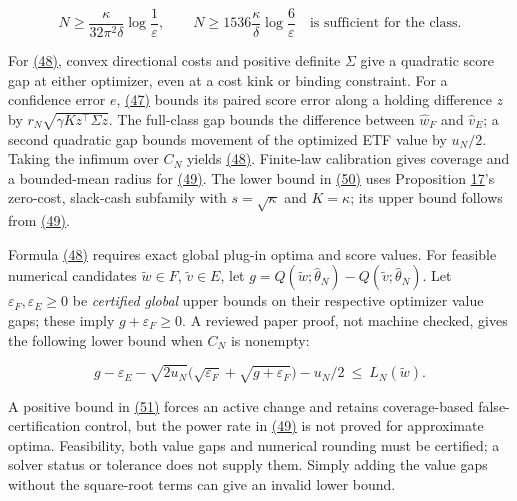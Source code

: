 \documentclass[11pt]{article}
\begin{document}
\begin{equation*}
N\geq\frac{\kappa}{32\pi^2\delta}
       \log\frac1\varepsilon,
\qquad
N\geq1536\frac{\kappa}{\delta}
       \log\frac6\varepsilon
\quad\text{is sufficient for the class}.\tag{50}\label{eq:50}
\end{equation*}

For \hyperref[eq:48]{(48)}, convex directional costs and positive definite
\(\Sigma\) give a quadratic score gap at either optimizer,
even at a cost kink or binding constraint. For a confidence
error \(e\), \hyperref[eq:47]{(47)} bounds its paired score error along a
holding difference \(z\) by
\(r_N\sqrt{\gamma K z^\top\Sigma z}\). The full-class
gap bounds the difference between \(\widehat w_F\) and
\(\widehat v_E\); a second quadratic gap bounds movement of
the optimized ETF value by \(u_N/2\). Taking the infimum
over \(C_N\) yields \hyperref[eq:48]{(48)}. Finite-law calibration gives
coverage and a bounded-mean radius for \hyperref[eq:49]{(49)}. The lower
bound in \hyperref[eq:50]{(50)} uses Proposition \hyperref[res:Proposition-17]{17}'s zero-cost, slack-cash
subfamily with \(s=\sqrt\kappa\) and \(K=\kappa\); its
upper bound follows from \hyperref[eq:49]{(49)}.

Formula \hyperref[eq:48]{(48)} requires exact global plug-in optima and score
values. For feasible numerical candidates
\(\widetilde w\in F\), \(\widetilde v\in E\), let
\(g=Q(\widetilde w;\widehat\theta_N)
-Q(\widetilde v;\widehat\theta_N)\). Let
\(\varepsilon_F,\varepsilon_E\geq0\) be \emph{certified global}
upper bounds on their respective optimizer value gaps; these
imply \(g+\varepsilon_F\geq0\). A
reviewed paper proof, not machine checked, gives the following
lower bound when \(C_N\) is nonempty:

\begin{equation*}
g-\varepsilon_E-\sqrt{2u_N}
  \bigl(\sqrt{\varepsilon_F}+\sqrt{g+\varepsilon_F}\bigr)
  -u_N/2
\ \leq\ L_N(\widetilde w).\tag{51}\label{eq:51}
\end{equation*}

A positive bound in \hyperref[eq:51]{(51)} forces an active change and retains
coverage-based false-certification control, but the power rate
in \hyperref[eq:49]{(49)} is not
proved for approximate optima. Feasibility, both value gaps
and numerical rounding must be certified; a solver status or
tolerance does not supply them. Simply adding the value gaps
without the square-root terms can give an invalid lower bound.
\end{document}
